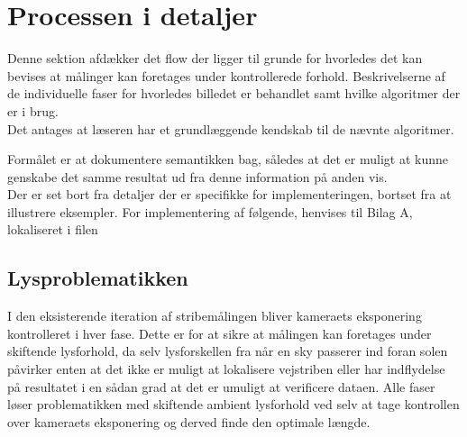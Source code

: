 \section{Processen i detaljer\label{ref::process}}

Denne sektion afdækker det flow der ligger til grunde for hvorledes det kan bevises at målinger kan foretages under kontrollerede forhold. Beskrivelserne af de individuelle faser for hvorledes billedet er behandlet samt hvilke algoritmer der er i brug.\\Det antages at læseren har et grundlæggende kendskab til de nævnte algoritmer.

Formålet er at dokumentere semantikken bag, således at det er muligt at kunne genskabe det samme resultat ud fra denne information på anden vis.\\
Der er set bort fra detaljer der er specifikke for implementeringen, bortset fra at illustrere eksempler.
For implementering af følgende, henvises til Bilag A, lokaliseret i filen 

\subsection{Lysproblematikken}
I den eksisterende iteration af stribemålingen bliver kameraets eksponering kontrolleret i hver fase. Dette er for at sikre at målingen kan foretages under skiftende lysforhold, da selv lysforskellen fra når en sky passerer ind foran solen påvirker enten at det ikke er muligt at lokalisere vejstriben eller har indflydelse på resultatet i en sådan grad at det er umuligt at verificere dataen.
Alle faser løser problematikken med skiftende ambient lysforhold ved selv at tage kontrollen over kameraets eksponering og derved finde den optimale længde.\\


